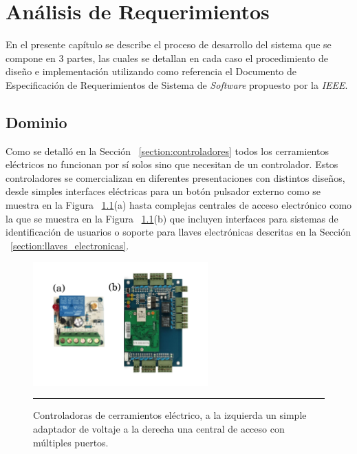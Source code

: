 
\chapter{Análisis de Requerimientos} %

En el presente capítulo se describe el proceso de desarrollo del sistema que se compone en 3 partes, las cuales se detallan en cada caso el procedimiento de diseño e implementación utilizando como referencia el Documento de Especificación de Requerimientos de Sistema de \textit{Software} propuesto por la \textit{IEEE}.\\

\label{Chapter3} %


\section{Dominio}
Como se detalló en la Sección ~\ref{section:controladores} todos los cerramientos eléctricos no funcionan por sí solos sino que necesitan de un controlador. Estos controladores se comercializan en diferentes presentaciones con distintos diseños, desde simples interfaces eléctricas para un botón pulsador externo como se muestra en la Figura ~\ref{fig:controladoras_simple_compleja}(a) hasta complejas centrales de acceso electrónico como la que se muestra en la Figura ~\ref{fig:controladoras_simple_compleja}(b) que incluyen interfaces para sistemas de identificación de usuarios o soporte para llaves electrónicas descritas en la Sección ~\ref{section:llaves_electronicas}.
\begin{figure}[htbp]
	\centering
	\includegraphics[width=0.6\textwidth]{Pictures/controladoras_simple_compleja.png}
	\rule{35em}{1pt}
	\caption[Controladoras Comparativa]{Controladoras de cerramientos eléctrico, a la izquierda un simple adaptador de voltaje a la derecha una central de acceso con múltiples puertos. }
	\label{fig:controladoras_simple_compleja}
\end{figure}

